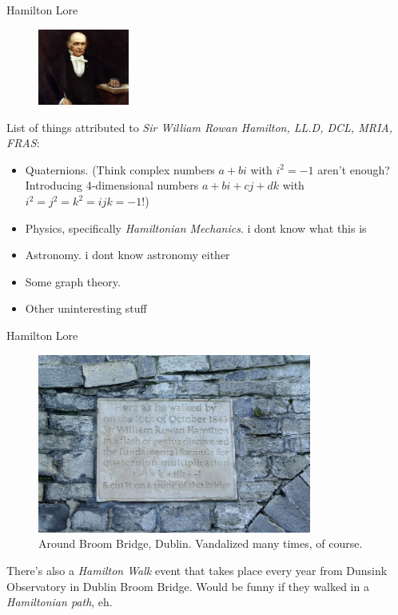 \documentclass{beamer}
\begin{document}
\begin{frame}{Hamilton Lore}

\begin{figure}[h]
    \centering
    \includegraphics[width=3cm]{img/hamilton.jpg}
\end{figure}

List of things attributed to \textit{Sir William Rowan Hamilton, LL.D, DCL, MRIA, FRAS}:
\pause
\begin{itemize}
    \item Quaternions. (Think complex numbers $a + bi$ with $i^2 = -1$ aren't enough? Introducing 4-dimensional numbers $a + bi + cj + dk$ with $i^2 = j^2 = k^2 = ijk = -1$!)
    \pause
    \item Physics, specifically \textit{Hamiltonian Mechanics}. {\tiny{i dont know what this is}}
    \item Astronomy. {\tiny{i dont know astronomy either}}
    \item Some graph theory.
    \item Other uninteresting stuff
\end{itemize}

\end{frame}

\begin{frame}{Hamilton Lore}

\begin{figure}[h]
    \centering
    \includegraphics[width=9cm]{img/quaternion_plaque.jpg}
    \caption*{Around Broom Bridge, Dublin. Vandalized many times, of course.}
\end{figure}

There's also a \textit{Hamilton Walk} event that takes place every year from Dunsink Observatory in Dublin Broom Bridge. Would be funny if they walked in a \textit{Hamiltonian path}, eh.

\end{frame}
\end{document}
